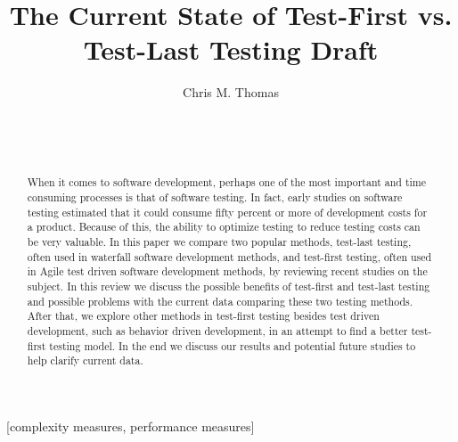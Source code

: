 \documentclass{sig-alternate}
\begin{document}

\title{The Current State of Test-First vs. Test-Last Testing Draft}


\author{
\alignauthor
Chris M. Thomas\\
	\\
	\\
	\\
}
\maketitle
\begin{abstract}

When it comes to software development, perhaps one of the most important and time consuming processes is that of software testing. In fact, early studies on software testing estimated that it could consume fifty percent or more of development costs for a product.  Because of this, the ability to optimize testing to reduce testing costs can be very valuable.  In this paper  we compare two popular methods, test-last testing, often used in waterfall software development methods, and test-first testing, often used in Agile test driven software development methods, by reviewing recent studies on the subject.  In this review we discuss the possible benefits of test-first and test-last testing and possible problems with the current data comparing these two testing methods.  After that, we explore other methods in test-first testing besides test driven development, such as behavior driven development, in an attempt to find a better test-first testing model.  In the end we discuss our results and potential future studies to help clarify current data.
\end{abstract}

[complexity measures, performance measures]
\end{document}
